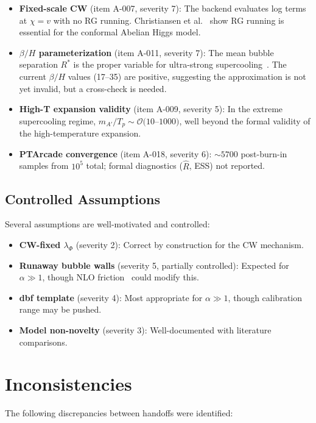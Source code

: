\documentclass[a4paper,11pt]{article}
\begin{document}
\begin{itemize}
\item \textbf{Fixed-scale CW} (item A-007, severity 7): The backend evaluates log terms at $\chi = v$ with no RG running. Christiansen et al.~\cite{christiansen2025} show RG running is essential for the conformal Abelian Higgs model.
\item \textbf{$\beta/H$ parameterization} (item A-011, severity 7): The mean bubble separation $R^*$ is the proper variable for ultra-strong supercooling~\cite{costa2025,li2026}. The current $\beta/H$ values (17--35) are positive, suggesting the approximation is not yet invalid, but a cross-check is needed.
\item \textbf{High-T expansion validity} (item A-009, severity 5): In the extreme supercooling regime, $m_{A'}/T_p \sim \mathcal{O}(10$--$1000)$, well beyond the formal validity of the high-temperature expansion.
\item \textbf{PTArcade convergence} (item A-018, severity 6): $\sim 5700$ post-burn-in samples from $10^5$ total; formal diagnostics ($\hat{R}$, ESS) not reported.
\end{itemize}

\subsection{Controlled Assumptions}

Several assumptions are well-motivated and controlled:
\begin{itemize}
\item \textbf{CW-fixed $\lambda_\Phi$} (severity 2): Correct by construction for the CW mechanism.
\item \textbf{Runaway bubble walls} (severity 5, partially controlled): Expected for $\alpha \gg 1$, though NLO friction~\cite{costa2025} could modify this.
\item \textbf{dbf template} (severity 4): Most appropriate for $\alpha \gg 1$, though calibration range may be pushed.
\item \textbf{Model non-novelty} (severity 3): Well-documented with literature comparisons.
\end{itemize}

\section{Inconsistencies}

The following discrepancies between handoffs were identified:
\end{document}
